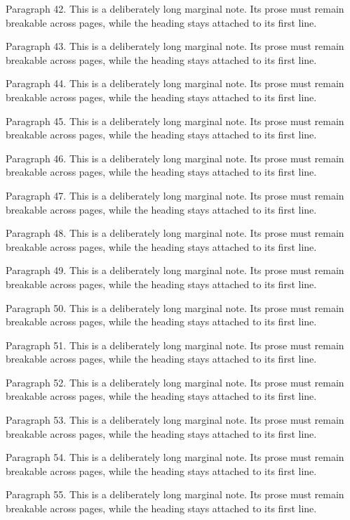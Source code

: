 \documentclass[11pt]{article}
\begin{document}
{Paragraph 42. This is a deliberately long marginal note. Its prose must remain breakable across pages, while the heading stays attached to its first line.\par
Paragraph 43. This is a deliberately long marginal note. Its prose must remain breakable across pages, while the heading stays attached to its first line.\par
Paragraph 44. This is a deliberately long marginal note. Its prose must remain breakable across pages, while the heading stays attached to its first line.\par
Paragraph 45. This is a deliberately long marginal note. Its prose must remain breakable across pages, while the heading stays attached to its first line.\par
Paragraph 46. This is a deliberately long marginal note. Its prose must remain breakable across pages, while the heading stays attached to its first line.\par
Paragraph 47. This is a deliberately long marginal note. Its prose must remain breakable across pages, while the heading stays attached to its first line.\par
Paragraph 48. This is a deliberately long marginal note. Its prose must remain breakable across pages, while the heading stays attached to its first line.\par
Paragraph 49. This is a deliberately long marginal note. Its prose must remain breakable across pages, while the heading stays attached to its first line.\par
Paragraph 50. This is a deliberately long marginal note. Its prose must remain breakable across pages, while the heading stays attached to its first line.\par
Paragraph 51. This is a deliberately long marginal note. Its prose must remain breakable across pages, while the heading stays attached to its first line.\par
Paragraph 52. This is a deliberately long marginal note. Its prose must remain breakable across pages, while the heading stays attached to its first line.\par
Paragraph 53. This is a deliberately long marginal note. Its prose must remain breakable across pages, while the heading stays attached to its first line.\par
Paragraph 54. This is a deliberately long marginal note. Its prose must remain breakable across pages, while the heading stays attached to its first line.\par
Paragraph 55. This is a deliberately long marginal note. Its prose must remain breakable across pages, while the heading stays attached to its first line.\par
}
\end{document}

